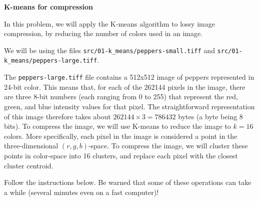 \item {\bf K-means for compression}

In this problem, we will apply the K-means algorithm to lossy image
compression, by reducing the number of colors used in an image.

We will be using the files \texttt{src/01-k\_means/peppers-small.tiff} and \texttt{src/01-k\_means/peppers-large.tiff}.
	

The \texttt{peppers-large.tiff} file contains
a 512x512 image of peppers represented in 24-bit color. This means
that, for each of the 262144 pixels in the image, there are three
8-bit numbers (each ranging from 0 to 255) that represent the red,
green, and blue intensity values for that pixel. The straightforward
representation of this image therefore takes about $262144 \times 3 =
786432$ bytes (a byte being 8 bits). To compress the image, we will
use K-means to reduce the image to $k = 16$ colors. More specifically,
each pixel in the image is considered a point in the three-dimensional
$(r, g, b)$-space. To compress the image, we will cluster these points
in color-space into 16 clusters, and replace each pixel with the
closest cluster centroid.

Follow the instructions below. Be warned that some of these operations
can take a while (several minutes even on a fast computer)!


\begin{enumerate}

  

  

\end{enumerate}

